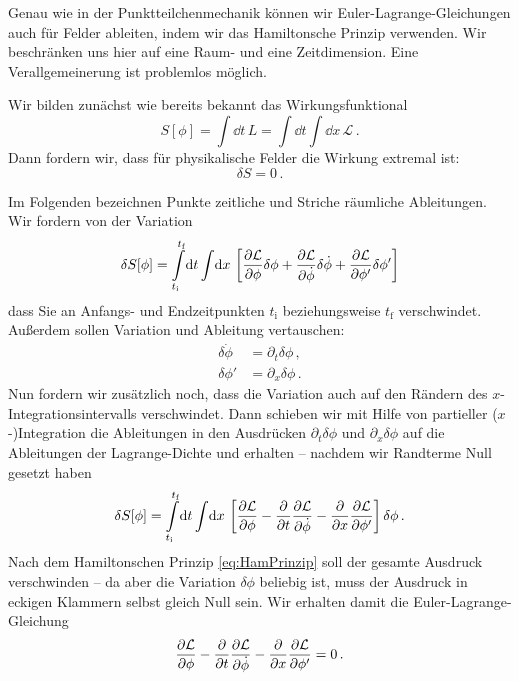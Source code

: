 \documentclass[paper=a4, fontsize=11.0pt, abstractoff, DIV12]{scrartcl}
\newcommand{\LD}{\ensuremath{\mathcal{L}}}
\newcommand{\ti}{\ensuremath{t_\mathrm{i}}}
\newcommand{\tf}{\ensuremath{t_\mathrm{f}}}
\begin{document}
Genau wie in der Punktteilchenmechanik können wir Euler-Lagrange-Gleichungen
auch für Felder ableiten, indem wir das Hamiltonsche Prinzip verwenden. Wir
beschränken uns hier auf eine Raum- und eine Zeitdimension. Eine
Verallgemeinerung ist problemlos möglich.

Wir bilden zunächst wie bereits bekannt das Wirkungsfunktional
\begin{equation}
S[\phi] = \int\!\dd t \,L = \int\!\dd t\int\!\dd x\,\LD\,.
\end{equation}
Dann fordern wir, dass für physikalische Felder die Wirkung extremal ist:
\begin{equation}
\delta S = 0\,.
\label{eq:HamPrinzip}
\end{equation}

Im Folgenden bezeichnen Punkte zeitliche und Striche räumliche Ableitungen.
Wir fordern von der Variation
\begin{equation}
\delta S[\phi] = \int\limits_{\ti}^{\tf}\!\dd t\int\!\dd x\,\left[\firstpderiv{\LD}{\phi}\delta\phi+\firstpderiv{\LD}{\dot{\phi}}\delta\dot{\phi}+\firstpderiv{\LD}{\phi'}\delta \phi' \right]
\end{equation}
dass Sie an Anfangs- und Endzeitpunkten $\ti$ beziehungsweise $\tf$
verschwindet. Außerdem sollen Variation und Ableitung vertauschen:
\begin{align}
\delta\dot{\phi} &= \partial_t\delta\phi\,,\\
\delta\phi' &= \partial_x\delta\phi\,.
\end{align}
Nun fordern wir zusätzlich noch, dass die Variation auch auf den Rändern des
$x$-Integrations\-in\-ter\-valls verschwindet. Dann schieben wir mit Hilfe von
partieller ($x$-)Integration die Ableitungen in den Ausdrücken
$\partial_t\delta\phi$ und $\partial_x\delta\phi$ auf die Ableitungen der
Lagrange-Dichte und erhalten -- nachdem wir Randterme Null gesetzt haben
\begin{equation}
\delta S[\phi] = \int\limits_{\ti}^{\tf}\!\dd t\int\!\dd x\,\left[\firstpderiv{\LD}{\phi} - \firstpderiv{}{t}\firstpderiv{\LD}{\dot{\phi}} - \firstpderiv{}{x}\firstpderiv{\LD}{\phi'} \right]\delta{\phi}\,.
\end{equation}
Nach dem Hamiltonschen Prinzip \eqref{eq:HamPrinzip} soll der gesamte Ausdruck
verschwinden -- da aber die Variation $\delta\phi$ beliebig ist, muss der
Ausdruck in eckigen Klammern selbst gleich Null sein. Wir erhalten damit die
Euler-Lagrange-Gleichung
\begin{equation}
\firstpderiv{\LD}{\phi} - \firstpderiv{}{t}\firstpderiv{\LD}{\dot{\phi}} - \firstpderiv{}{x}\firstpderiv{\LD}{\phi'} = 0\,.
\label{eq:ELG}
\end{equation}
\end{document}
